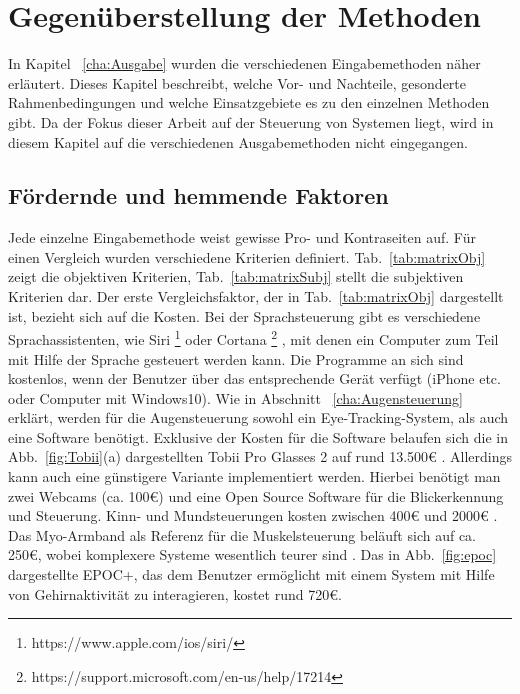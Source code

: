 \chapter{Gegenüberstellung der Methoden}
\label{cha:Vergleich}

In Kapitel ~\ref{cha:Ausgabe} wurden die verschiedenen Eingabemethoden näher erläutert. Dieses Kapitel beschreibt, welche Vor- und Nachteile, gesonderte Rahmenbedingungen und welche Einsatzgebiete es zu den einzelnen Methoden gibt. Da der Fokus dieser Arbeit auf der Steuerung von Systemen liegt, wird in diesem Kapitel auf die verschiedenen Ausgabemethoden nicht eingegangen.

\section{Fördernde und hemmende Faktoren}
%
Jede einzelne Eingabemethode weist gewisse Pro- und Kontraseiten auf. Für einen Vergleich wurden verschiedene Kriterien definiert. Tab.~\ref{tab:matrixObj} zeigt die objektiven Kriterien, Tab.~\ref{tab:matrixSubj} stellt die subjektiven Kriterien dar.
\newline \newline
Der erste Vergleichsfaktor, der in Tab.~\ref{tab:matrixObj} dargestellt ist, bezieht sich auf die Kosten. Bei der Sprachsteuerung gibt es verschiedene Sprachassistenten, wie \zB Siri%
\footnote{https://www.apple.com/ios/siri/}
%
 oder Cortana%
\footnote{https://support.microsoft.com/en-us/help/17214}
%
 , mit denen ein Computer zum Teil mit Hilfe der Sprache gesteuert werden kann. Die Programme an sich sind kostenlos, wenn der Benutzer über das entsprechende Gerät verfügt (iPhone etc. oder Computer mit Windows10).
Wie in Abschnitt ~\ref{cha:Augensteuerung} erklärt, werden für die Augensteuerung sowohl ein Eye-Tracking-System, als auch eine Software benötigt. Exklusive der Kosten für die Software belaufen sich die in Abb.~\ref{fig:Tobii}(a) dargestellten Tobii Pro Glasses 2 auf rund 13.500€ \cite{TobiiCosts}. Allerdings kann auch eine günstigere Variante implementiert werden. Hierbei benötigt man zwei Webcams (ca. 100€) und eine Open Source Software für die Blickerkennung und Steuerung. Kinn- und Mundsteuerungen kosten zwischen 400€ und 2000€ \cite{SENSORY} \cite{INTEGRA}. Das Myo-Armband als Referenz für die Muskelsteuerung beläuft sich auf ca. 250€, wobei komplexere Systeme wesentlich teurer sind \cite{myoBand}. Das in Abb.~\ref{fig:epoc} dargestellte EPOC+, das dem Benutzer ermöglicht mit einem System mit Hilfe von Gehirnaktivität zu interagieren, kostet rund 720€.
